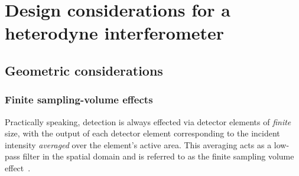 \chapter{Design considerations for a heterodyne interferometer}
\label{ch:DesignConsiderations}


\section{Geometric considerations}


\subsection{Finite sampling-volume effects}
\label{sec:DesignConsiderations:geometric:finite_sampling_volume}
Practically speaking, detection is always effected
via detector elements of \emph{finite} size,
with the output of each detector element
corresponding to the incident intensity
\emph{averaged} over the element's active area.
This averaging acts as a low-pass filter in the spatial domain and
is referred to as the finite sampling volume effect~\cite{bravenec_rsi95}.

